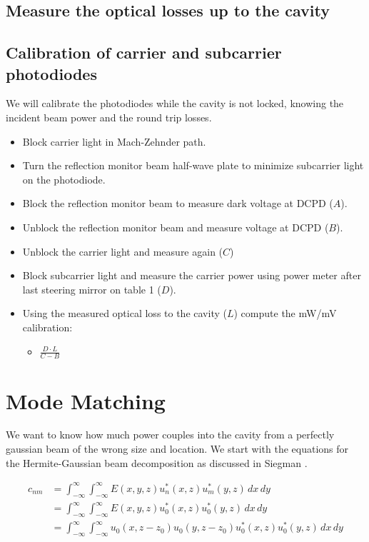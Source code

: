 \subsection{Measure the optical losses up to the cavity}

\subsection{Calibration of carrier and subcarrier photodiodes}
We will calibrate the photodiodes while the cavity is not locked, knowing the incident beam power and the round trip losses.

\begin{itemize}
    \item Block carrier light in Mach-Zehnder path.
    \item Turn the reflection monitor beam half-wave plate to minimize subcarrier light on the photodiode.
    \item Block the reflection monitor beam to measure dark voltage at DCPD ($A$).
    \item Unblock the reflection monitor beam and measure voltage at DCPD ($B$).
    \item Unblock the carrier light and measure again ($C$)
    \item Block subcarrier light and measure the carrier power using power meter after last steering mirror on table 1 ($D$).
    \item Using the measured optical loss to the cavity ($L$) compute the mW/mV calibration:
    \begin{itemize}
        \item $\frac{D\cdot L}{C - B}$
    \end{itemize}
\end{itemize}

\section{Mode Matching}
We want to know how much power couples into the cavity from a
perfectly gaussian beam of the wrong size and location. We start with
the equations for the Hermite-Gaussian beam decomposition as discussed in
Siegman \cite{Siegman86}. 

\newcommand{\intinfxy}[1]{\int^{\infty}_{- \infty} \int^{\infty}_{- \infty} #1 \,dx \,dy}
\newcommand{\intinfrt}[1]{\int^{2 \pi}_{0} \int^{\infty}_{0} #1 r \,dr \,d\theta}


\begin{align}
    c_{nm} &= \intinfxy{
    E(x,y,z) u_n^*(x,z)u_m^*(y,z)} \nonumber
\\  &= \intinfxy{
    E(x,y,z) u_0^*(x,z)u_0^*(y,z)} \nonumber
\\  &= \intinfxy{
    u_0(x,z-z_0)u_0(y,z-z_0) u_0^*(x,z)u_0^*(y,z)}
\end{align}

